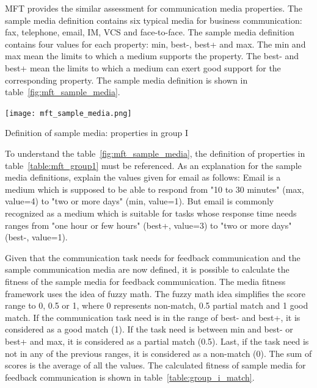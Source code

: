 \documentclass[english,12pt,a4paper,pdftex]{article}
\begin{document}
\ac{MFT} provides the similar assessment for communication media properties. The sample media definition contains six typical media for business communication: fax, telephone, email, \ac{IM}, \ac{VCS} and face-to-face. The sample media definition contains four values for each property: min, best-, best+ and max. The min and max mean the limits to which a medium supports the property. The best- and best+ mean the limits to which a medium can exert good support for the corresponding property. The sample media definition is shown in table~\ref{fig:mft_sample_media}.

\begin{table}[htb]
\begin{center}
\texttt{[image: mft\_sample\_media.png]}
\end{center}
\caption{Definition of sample media: properties in group I \citep{higa2007}}
\label{fig:mft_sample_media}
\end{table}

To understand the table~\ref{fig:mft_sample_media}, the definition of properties in table~\ref{table:mft_group1} must be referenced. As an explanation for the sample media definitions, \citet{higa2007} explain the values given for email as follows: Email is a medium which is supposed to be able to respond from "10 to 30 minutes" (max, value=4) to "two or more days" (min, value=1). But email is commonly recognized as a medium which is suitable for tasks whose response time needs ranges from "one hour or few hours" (best+, value=3) to "two or more days" (best-, value=1).

Given that the communication task needs for feedback communication and the sample communication media are now defined, it is possible to calculate the fitness of the sample media for feedback communication. The media fitness framework uses the idea of fuzzy math. The fuzzy math idea simplifies the score range to 0, 0.5 or 1, where 0 represents non-match, 0.5 partial match and 1 good match. If the communication task need is in the range of best- and best+, it is considered as a good match (1). If the task need is between min and best- or best+ and max, it is considered as a partial match (0.5). Last, if the task need is not in any of the previous ranges, it is considered as a non-match (0). The sum of scores is the average of all the values. The calculated fitness of sample media for feedback communication is shown in table~\ref{table:group_i_match}.
\end{document}
